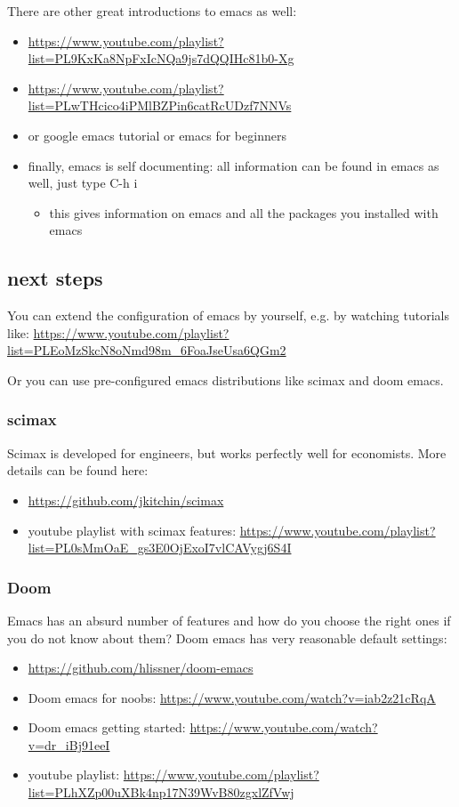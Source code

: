 \documentclass[11pt]{article}
\begin{document}
There are other great introductions to emacs as well:
\begin{itemize}
\item \url{https://www.youtube.com/playlist?list=PL9KxKa8NpFxIcNQa9js7dQQIHc81b0-Xg}
\item \url{https://www.youtube.com/playlist?list=PLwTHcico4iPMlBZPin6catRcUDzf7NNVs}
\item or google emacs tutorial or emacs for beginners
\item finally, emacs is self documenting: all information can be found in emacs as well, just type C-h i
\begin{itemize}
\item this gives information on emacs and all the packages you installed with emacs
\end{itemize}
\end{itemize}


\subsection{next steps}
\label{sec:orgf3c3a43}

You can extend the configuration of emacs by yourself, e.g. by watching tutorials like: \url{https://www.youtube.com/playlist?list=PLEoMzSkcN8oNmd98m\_6FoaJseUsa6QGm2}

Or you can use pre-configured emacs distributions like scimax and doom emacs.


\subsubsection{scimax}
\label{sec:orgdff1aaa}

Scimax is developed for engineers, but works perfectly well for economists. More details can be found here:
\begin{itemize}
\item \url{https://github.com/jkitchin/scimax}
\item youtube playlist with scimax features: \url{https://www.youtube.com/playlist?list=PL0sMmOaE\_gs3E0OjExoI7vlCAVygj6S4I}
\end{itemize}

\subsubsection{Doom}
\label{sec:org4ab38dd}

Emacs has an absurd number of features and how do you choose the right ones if you do not know about them? Doom emacs has very reasonable default settings:
\begin{itemize}
\item \url{https://github.com/hlissner/doom-emacs}
\item Doom emacs for noobs: \url{https://www.youtube.com/watch?v=iab2z21cRqA}
\item Doom emacs getting started: \url{https://www.youtube.com/watch?v=dr\_iBj91eeI}
\item youtube playlist: \url{https://www.youtube.com/playlist?list=PLhXZp00uXBk4np17N39WvB80zgxlZfVwj}
\end{itemize}
\end{document}

